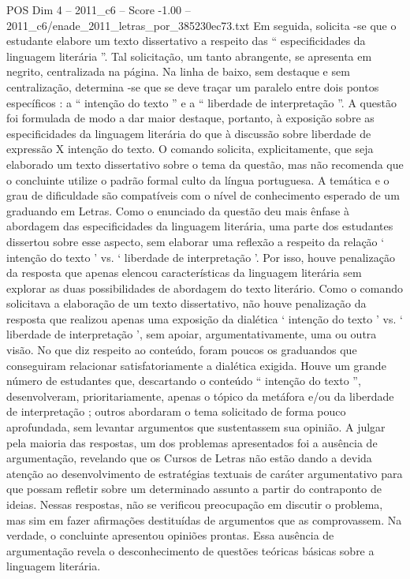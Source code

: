 \begin{textsample}{POS Dim 4 – 2011\_c6 – Score -1.00 – 2011\_c6/enade\_2011\_letras\_por\_385230ec73.txt}
Em seguida, solicita -se que o estudante elabore um texto dissertativo a respeito das “ especificidades da linguagem literária ”.
Tal solicitação, um tanto abrangente, se apresenta em negrito, centralizada na página.
Na linha de baixo, sem destaque e sem centralização, determina -se que se deve traçar um paralelo entre dois pontos específicos : a “ intenção do texto ” e a “ liberdade de interpretação ”.
A questão foi formulada de modo a dar maior destaque, portanto, à exposição sobre as especificidades da linguagem literária do que à discussão sobre liberdade de expressão X intenção do texto.
O comando solicita, explicitamente, que seja elaborado um texto dissertativo sobre o tema da questão, mas não recomenda que o concluinte utilize o padrão formal culto da língua portuguesa.
A temática e o grau de dificuldade são compatíveis com o nível de conhecimento esperado de um graduando em Letras.
Como o enunciado da questão deu mais ênfase à abordagem das especificidades da linguagem literária, uma parte dos estudantes dissertou sobre esse aspecto, sem elaborar uma reflexão a respeito da relação ‘ intenção do texto ’ vs. ‘ liberdade de interpretação ’.
Por isso, houve penalização da resposta que apenas elencou características da linguagem literária sem explorar as duas possibilidades de abordagem do texto literário.
Como o comando solicitava a elaboração de um texto dissertativo, não houve penalização da resposta que realizou apenas uma exposição da dialética ‘ intenção do texto ’ vs. ‘ liberdade de interpretação ’, sem apoiar, argumentativamente, uma ou outra visão.
No que diz respeito ao conteúdo, foram poucos os graduandos que conseguiram relacionar satisfatoriamente a dialética exigida.
Houve um grande número de estudantes que, descartando o conteúdo “ intenção do texto ”, desenvolveram, prioritariamente, apenas o tópico da metáfora e/ou da liberdade de interpretação ; outros abordaram o tema solicitado de forma pouco aprofundada, sem levantar argumentos que sustentassem sua opinião.
A julgar pela maioria das respostas, um dos problemas apresentados foi a ausência de argumentação, revelando que os Cursos de Letras não estão dando a devida atenção ao desenvolvimento de estratégias textuais de caráter argumentativo para que possam refletir sobre um determinado assunto a partir do contraponto de ideias.
Nessas respostas, não se verificou preocupação em discutir o problema, mas sim em fazer afirmações destituídas de argumentos que as comprovassem.
Na verdade, o concluinte apresentou opiniões prontas.
Essa ausência de argumentação revela o desconhecimento de questões teóricas básicas sobre a linguagem literária.

\end{textsample}
